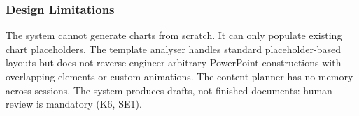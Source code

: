 \subsubsection{Design Limitations}

The system cannot generate charts from scratch. It can only populate existing chart placeholders. The template analyser handles standard placeholder-based layouts but does not reverse-engineer arbitrary PowerPoint constructions with overlapping elements or custom animations. The content planner has no memory across sessions. The system produces drafts, not finished documents: human review is mandatory (K6, SE1).
